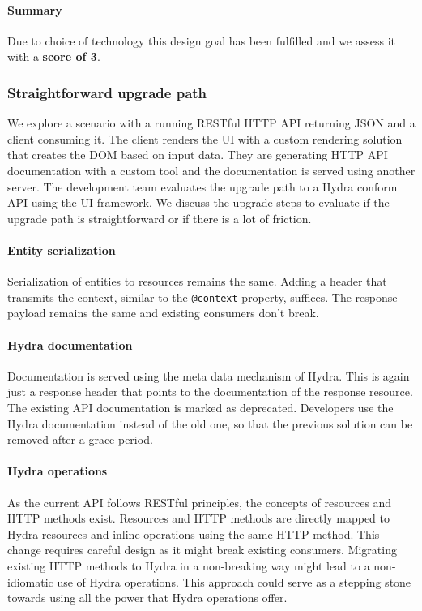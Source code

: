 \paragraph{Summary}
Due to choice of technology this design goal has been fulfilled and we assess it with a \textbf{score of 3}.

\subsubsection{Straightforward upgrade path}
We explore a scenario with a running RESTful HTTP API returning JSON and a client consuming it. The client renders the UI with a custom rendering solution that creates the DOM based on input data. They are generating HTTP API documentation with a custom tool and the documentation is served using another server. The development team evaluates the upgrade path to a Hydra conform API using the UI framework. We discuss the upgrade steps to evaluate if the upgrade path is straightforward or if there is a lot of friction.

\paragraph{Entity serialization}
Serialization of entities to resources remains the same. Adding a header that transmits the context, similar to the \lstinline{@context} property, suffices. The response payload remains the same and existing consumers don't break.

\paragraph{Hydra documentation}
Documentation is served using the meta data mechanism of Hydra. This is again just a response header that points to the documentation of the response resource. The existing API documentation is marked as deprecated. Developers use the Hydra documentation instead of the old one, so that the previous solution can be removed after a grace period.

\paragraph{Hydra operations}
As the current API follows RESTful principles, the concepts of resources and HTTP methods exist. Resources and HTTP methods are directly mapped to Hydra resources and inline operations using the same HTTP method. This change requires careful design as it might break existing consumers. Migrating existing HTTP methods to Hydra in a non-breaking way might lead to a non-idiomatic use of Hydra operations. This approach could serve as a stepping stone towards using all the power that Hydra operations offer.

